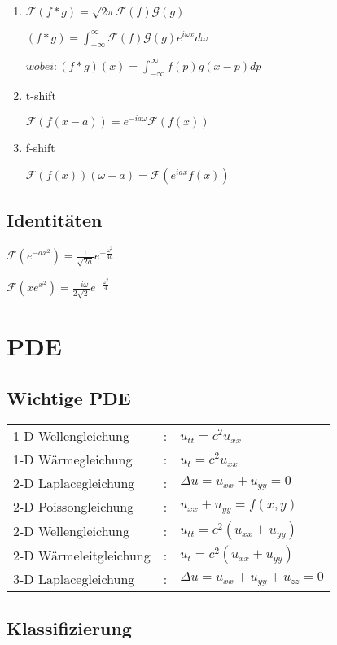 \documentclass[10pt,a4paper]{scrartcl}
\newcommand{\F}{\mathscr{F}}
\begin{document}
\begin{multicols*}{3}
\begin{enumerate}
	\item
	$\F(f\ast g)=\sqrt{2\pi}\F(f)\mathscr{G}(g)$
	
	$(f\ast g) = \int_{-\infty}^{\infty}{\F(f)\mathscr{G}(g)e^{i\omega x}d\omega}$
	
	$wobei: (f\ast g)(x) = \int_{-\infty}^{\infty}{f(p)g(x-p)dp}$
	
	\item
	t-shift
		
	$\F(f(x-a))=e^{-ia\omega}\F(f(x))$
	
	\item
	f-shift
	
	$\F(f(x))(\omega -a)=\F(e^{iax}f(x))$
	
	\end{enumerate}
	
	\subsection{Identitäten}
	
	$\F(e^{-ax^2})=\frac{1}{\sqrt{2a}}e^{-\frac{\omega^2}{4a}}$
	
	$\F(xe^{x^2})=\frac{-i\omega}{2\sqrt{2}}e^{-\frac{\omega^2}{4}}$
	
	\section{PDE}
	
	\subsection{Wichtige PDE}
	
	\begin{tabularx}{\linewidth}{|lXl|}
	\hline
	1-D Wellengleichung  & : &	$u_{tt}=c^2u_{xx}$\\
	1-D Wärmegleichung	& : &	$u_t=c^2u_{xx}$\\
	2-D Laplacegleichung	& : &	$\Delta u=u_{xx}+u_{yy}=0$\\
	2-D Poissongleichung	& : &	$u_{xx}+u_{yy}=f(x,y)$\\
	2-D Wellengleichung	& : &	$u_{tt}=c^2(u_{xx}+u_{yy})$\\
	2-D Wärmeleitgleichung	& : &	$u_t=c^2(u_{xx}+u_{yy})$\\
	3-D Laplacegleichung	& : &	$\Delta u=u_{xx}+u_{yy}+u_{zz}=0$\\
	\hline
	\end{tabularx}
	
	\subsection{Klassifizierung}
	

\end{multicols*}
\end{document}

